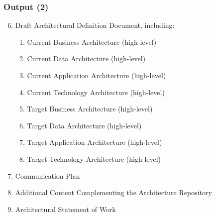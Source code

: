 \documentclass[aspectratio=169, table]{beamer}
\begin{document}
    \begin{frame}
        \frametitle{Output (2)}
        \vspace{1cm}
        \begin{enumerate}
            \setcounter{enumi}{5}
            \item Draft Architectural Definition Document, including:
            \begin{enumerate}
                \item Current Business Architecture (high-level)
                \item Current Data Architecture (high-level)
                \item Current Application Architecture (high-level)
                \item Current Technology Architecture (high-level)
                \item Target Business Architecture (high-level)
                \item Target Data Architecture (high-level)
                \item Target Application Architecture (high-level)
                \item Target Technology Architecture (high-level)
            \end{enumerate}
            \item Communication Plan
            \item Additional Content Complementing the Architecture Repository
            \item Architectural Statement of Work
        \end{enumerate}
    \end{frame}
\end{document}
